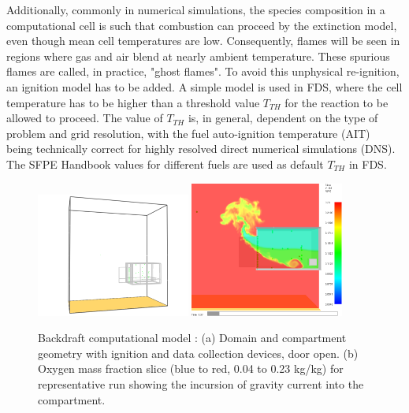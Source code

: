 \documentclass[12pt,letterpaper]{article}
\begin{document}
\begin{flushleft}
Additionally, commonly in numerical simulations, the species composition in a computational cell is such that combustion can proceed by the extinction model, even though mean cell temperatures are low. Consequently, flames will be seen in regions where gas and air blend at nearly ambient temperature. These spurious flames are called, in practice, "ghost flames". To avoid this unphysical re-ignition, an ignition model has to be added. A simple model is used in FDS, where the cell temperature has to be higher than a threshold value $T_{TH}$ for the reaction to be allowed to proceed. The value of $T_{TH}$ is, in general, dependent on the type of problem and grid resolution, with the fuel auto-ignition temperature (AIT)~\cite{SFPE:Beyler} being technically correct for highly resolved direct numerical simulations (DNS). The SFPE Handbook values for different fuels are used as default $T_{TH}$ in FDS.
%
\begin{figure}[tb]
    \centering
    \includegraphics[trim = 50mm 0mm 0mm 0mm, clip,width=0.45\textwidth]{IAFSS_Paper/Figures/NIST_Backdraft_Domain1.png}
    \includegraphics[trim = 0mm 10mm 30mm 0mm, clip,width=0.45\textwidth]{IAFSS_Paper/Figures/NIST_Backdraft_GC1.png}
     \\
    \caption{Backdraft computational model : (a) Domain and compartment geometry with ignition and data collection devices, door open. (b) Oxygen mass fraction slice (blue to red, 0.04 to 0.23 kg/kg) for representative run showing the incursion of gravity current into the compartment.}
    \label{fig:model_setup}
\end{figure}


\end{flushleft}
\end{document}
